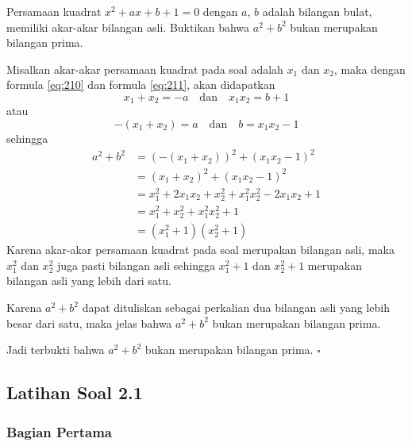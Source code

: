 	\begin{contoh}
		Persamaan kuadrat $ x^{2} + ax + b + 1 = 0 $ dengan $ a $, $ b $ adalah bilangan bulat, memiliki akar-akar bilangan asli. Buktikan bahwa $ a^{2} + b^{2} $ bukan merupakan bilangan prima.
	\end{contoh}
	\begin{jawab}
		Misalkan akar-akar persamaan kuadrat pada soal adalah $ x_{1} $ dan $ x_{2} $, maka dengan formula \ref{eq:210} dan formula \ref{eq:211}, akan didapatkan
		$$ x_{1} + x_{2} = -a \quad \mbox{dan} \quad x_{1}x_{2} = b + 1 $$
		atau
		$$ -\left(x_{1} + x_{2}\right) = a \quad \mbox{dan} \quad b = x_{1}x_{2} - 1 $$
		sehingga
		\begin{align*}
			a^{2} + b^{2} &= \left(-\left(x_{1} + x_{2}\right)\right)^{2} + \left(x_{1}x_{2} - 1\right)^{2} \\
			&= \left(x_{1} + x_{2}\right)^{2} + \left(x_{1}x_{2} - 1\right)^{2} \\
			&= x_{1}^{2} + 2x_{1}x_{2} + x_{2}^{2} + x_{1}^{2}x_{2}^{2} - 2x_{1}x_{2} + 1 \\
			&= x_{1}^{2} + x_{2}^{2} + x_{1}^{2}x_{2}^{2} + 1 \\
			&= \left(x_{1}^{2} + 1\right)\left(x_{2}^{2} + 1\right)
		\end{align*}
		Karena akar-akar persamaan kuadrat pada soal merupakan bilangan asli, maka $ x_{1}^{2} $ dan $ x_{2}^{2} $ juga pasti bilangan asli sehingga $ x_{1}^{2} + 1 $ dan $ x_{2}^{2} + 1 $ merupakan bilangan asli yang lebih dari satu.
		\par \noindent Karena $ a^{2} + b^{2} $ dapat dituliskan sebagai perkalian dua bilangan asli yang lebih besar dari satu, maka jelas bahwa $ a^{2} + b^{2} $ bukan merupakan bilangan prima.
		\par \noindent Jadi terbukti bahwa $ a^{2} + b^{2} $ bukan merupakan bilangan prima. \hfill $ \square $
	\end{jawab}

\newpage

\subsection{Latihan Soal 2.1}
	
	\subsubsection{Bagian Pertama}
		

